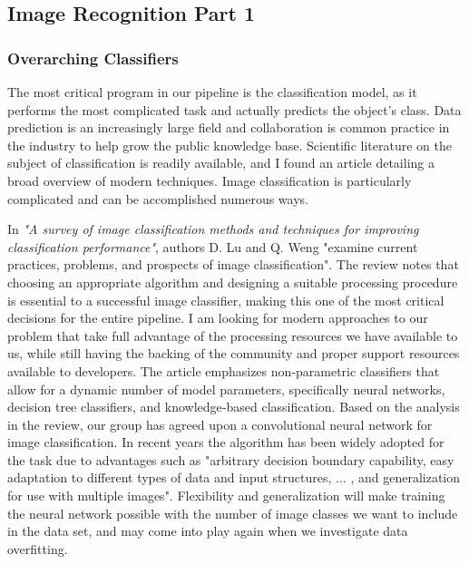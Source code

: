\documentclass[draftclsnofoot, onecolumn, 10pt, compsoc]{IEEEtran}
\begin{document}
	\subsection{Image Recognition Part 1}
    	\subsubsection{Overarching Classifiers}
        	The most critical program in our pipeline is the classification model, as it performs the most complicated task and actually predicts the object's class. Data prediction is an increasingly large field and collaboration is common practice in the industry to help grow the public knowledge base. Scientific literature on the subject of classification is readily available, and I found an article detailing a broad overview of modern techniques. Image classification is particularly complicated and can be accomplished numerous ways. 
            
In \textit{"A survey of image classification methods and techniques for improving classification performance"}, authors D. Lu and Q. Weng "examine current practices, problems, and prospects of image classification". The review notes that choosing an appropriate algorithm and designing a suitable processing procedure is essential to a successful image classifier, making this one of the most critical decisions for the entire pipeline. I am looking for modern approaches to our problem that take full advantage of the processing resources we have available to us, while still having the backing of the community and proper support resources available to developers. The article emphasizes non‐parametric classifiers that allow for a dynamic number of model parameters, specifically neural networks, decision tree classifiers, and knowledge‐based classification. Based on the analysis in the review, our group has agreed upon a convolutional neural network for image classification. In recent years the algorithm has been widely adopted for the task due to advantages such as "arbitrary decision boundary capability, easy adaptation to different types of data and input structures, ... , and generalization for use with multiple images". Flexibility and generalization will make training the neural network possible with the number of image classes we want to include in the data set, and may come into play again when we investigate data overfitting. \cite{Lu}
            
\end{document}
